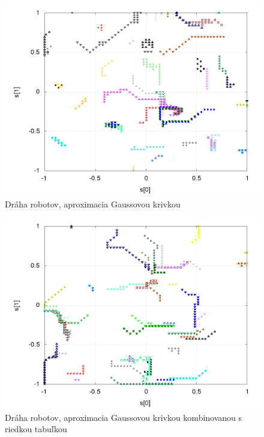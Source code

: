   \begin{figure}[!htb]
  \centering
  \includegraphics[scale=.4]{../../results_q_learning/map_2/function_type_2/iterations_10/agents_path_surface.png}
  \caption{Dráha robotov, aproximacia  Gaussovou krivkou}
  \label{img:experiment_gauss_path}
  \end{figure}


  \begin{figure}[!htb]
  \centering
  \includegraphics[scale=.4]{../../results_q_learning/map_2/function_type_3/iterations_10/agents_path_surface.png}
  \caption{Dráha robotov, aproximacia  Gaussovou krivkou kombinovanou s riedkou tabuľkou}
  \label{img:experiment_gauss_sparse_table_path}
  \end{figure}


